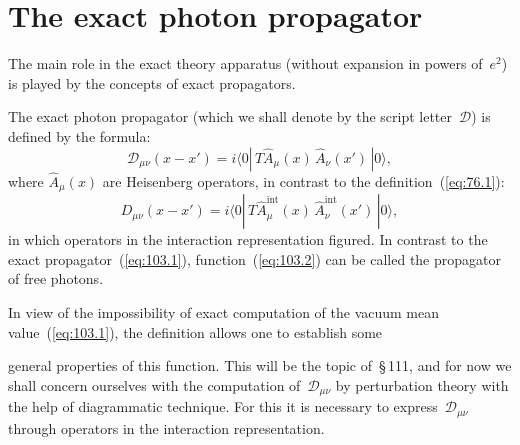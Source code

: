 
\section{The exact photon propagator}


The main role in the exact theory apparatus (without expansion in powers of~$e^2$) is played by the concepts of exact propagators.

The exact photon propagator (which we shall denote by the script letter~$\mathcal{D}$) is defined by the formula:
\begin{equation}
\mathcal{D}_{\mu\nu}(x - x') = i\langle 0|\,T\hat{A}_\mu(x)\,\hat{A}_\nu(x')\,|0\rangle,
\label{eq:103.1}
\end{equation}
where $\hat{A}_\mu(x)$ are Heisenberg operators, in contrast to the definition~(\ref{eq:76.1}):
\begin{equation}
D_{\mu\nu}(x - x') = i\langle 0|\,T\hat{A}_{\mu}^{\mathrm{int}}(x)\,\hat{A}_{\nu}^{\mathrm{int}}(x')\,|0\rangle,
\label{eq:103.2}
\end{equation}
in which operators in the interaction representation figured. In contrast to the exact propagator~(\ref{eq:103.1}), function~(\ref{eq:103.2}) can be called the propagator of free photons.

In view of the impossibility of exact computation of the vacuum mean value~(\ref{eq:103.1}), the definition allows one to establish some


\noindent general properties of this function. This will be the topic of~\S\,111, and for now we shall concern ourselves with the computation of~$\mathcal{D}_{\mu\nu}$ by perturbation theory with the help of diagrammatic technique. For this it is necessary to express~$\mathcal{D}_{\mu\nu}$ through operators in the interaction representation.

